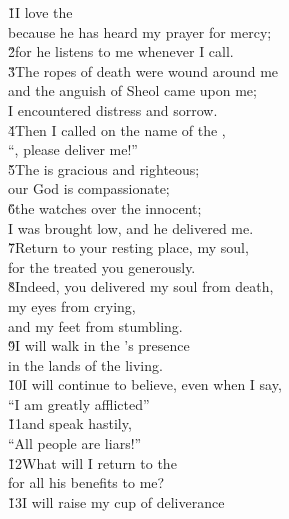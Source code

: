 \begin{poetry}
\poeml \v{1}I love the  \\
\poemll    because he has heard my prayer for mercy; \\
\poeml \v{2}for he listens to me whenever I call. \\
\poeml \v{3}The ropes of death were wound around me \\
\poemll    and the anguish of Sheol came upon me; \\
\poemlll       I encountered distress and sorrow. \\
\poeml \v{4}Then I called on the name of the , \\
\poemll    ``, please deliver me!'' \\
\poeml \v{5}The  is gracious and righteous; \\
\poemll    our God is compassionate; \\
\poeml \v{6}the  watches over the innocent; \\
\poemll    I was brought low, and he delivered me. \\
\poeml \v{7}Return to your resting place, my soul, \\
\poemll    for the  treated you generously. \\
\poeml \v{8}Indeed, you delivered my soul from death, \\
\poemll    my eyes from crying, \\
\poemlll       and my feet from stumbling. \\
\poeml \v{9}I will walk in the 's presence \\
\poemll    in the lands of the living. \\
\poeml \v{10}I will continue to believe, even when I say, \\
\poemll    ``I am greatly afflicted'' \\
\poeml \v{11}and speak hastily, \\
\poemll    ``All people are liars!'' \\
\poeml \v{12}What will I return to the  \\
\poemll    for all his benefits to me? \\
\poeml \v{13}I will raise my cup of deliverance \\

\end{poetry}
